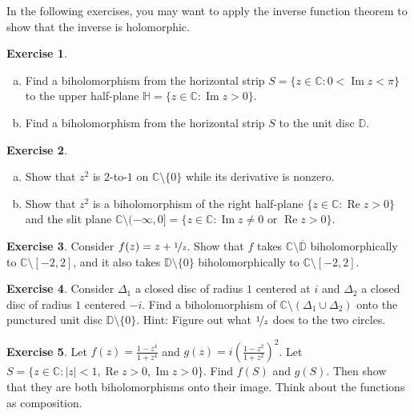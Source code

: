 \documentclass[12pt,openany]{book}
\renewcommand{\Re}{\operatorname{Re}}
\renewcommand{\Im}{\operatorname{Im}}
\newcommand{\sabs}[1]{\lvert {#1} \rvert}
\newcommand{\C}{{\mathbb{C}}}
\newcommand{\D}{{\mathbb{D}}}
\newcommand{\bH}{{\mathbb{H}}}
\theoremstyle{plain}
\theoremstyle{remark}
\theoremstyle{definition}
\newenvironment{exbox}{%
    \def\FrameCommand{\vrule width 1pt \relax\hspace{10pt}}%
    \MakeFramed{\advance\hsize-\width\FrameRestore}%
}{%
    \endMakeFramed
}
\newenvironment{exparts}{%
    \leavevmode\begin{enumerate}[a),noitemsep,topsep=0pt,parsep=0pt,partopsep=0pt]
}{%
    \end{enumerate}
}
\theoremstyle{exercise}
\newtheorem{exercise}{Exercise}[section]
\theoremstyle{example}
\begin{document}
In the following exercises, you may want to apply the inverse
function theorem to show that the inverse is holomorphic.

\begin{exbox}
\begin{exercise}
\begin{exparts}
\item
Find a biholomorphism from the horizontal strip
$S = \{ z \in \C : 0 < \Im z < \pi \}$ to
the upper half-plane $\bH = \{ z \in \C : \Im z > 0 \}$.
\item
Find a biholomorphism from the horizontal strip
$S$ to the unit disc $\D$.
\end{exparts}
\end{exercise}

\begin{exercise}
\pagebreak[2]
\begin{exparts}
\item
Show that $z^2$ is $2$-to-$1$ on $\C \setminus \{ 0 \}$ while its
derivative is nonzero.
\item
Show that $z^2$ is a biholomorphism of the right half-plane
$\{ z \in \C : \Re z > 0 \}$
and the slit plane $\C \setminus (-\infty,0] = \{ z \in \C : \Im z \not= 0 \text{ or } \Re z > 0 \}$.
\end{exparts}
\end{exercise}

\begin{exercise} \label{exercise:segmentcomplement}
Consider $f(z) = z+ \nicefrac{1}{z}$.  Show that $f$ takes $\C \setminus
\overline{\D}$ biholomorphically to $\C \setminus [-2,2]$, and it also takes
$\D \setminus \{ 0 \}$ biholomorphically to $\C \setminus [-2,2]$.
\end{exercise}

\begin{exercise}
Consider $\Delta_1$ a closed disc of radius $1$ centered at $i$ and
$\Delta_2$ a closed disc of radius $1$ centered $-i$.
Find a biholomorphism of $\C \setminus (\Delta_1 \cup \Delta_2)$
onto the punctured unit disc $\D \setminus \{ 0 \}$.
Hint: Figure out what $\nicefrac{1}{z}$ does to the two circles.
\end{exercise}

\begin{exercise}
Let $f(z) = \frac{1-z^4}{1+z^4}$ and $g(z) = i {\left( \frac{1-z^2}{1+z^2}
\right)}^2$.  Let $S = \{ z \in \C : \sabs{z} < 1, \Re z > 0, \Im z > 0 \}$.
Find $f(S)$ and $g(S)$.  Then show that they are both biholomorphisms onto their
image.  Think about the functions as composition.
\end{exercise}


\end{exbox}
\end{document}
